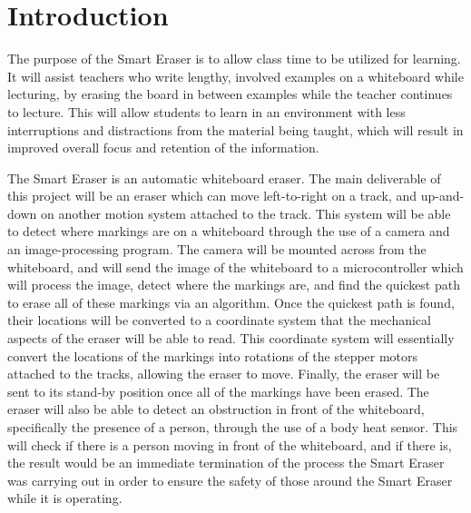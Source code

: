  \section{Introduction}
 The purpose of the Smart Eraser is to allow class time to be utilized for learning. It will assist teachers who write lengthy, involved examples on a whiteboard while lecturing, by erasing the board in between examples while the teacher continues to lecture. This will allow students to learn in an environment with less interruptions and distractions from the material being taught, which will result in improved overall focus and retention of the information.  
 \par
\setlength{\parindent}{2.5ex}The Smart Eraser is an automatic whiteboard eraser. The main deliverable of  this project will be an eraser which can move left-to-right on a track, and up-and-down on another motion system attached to the track. This system will be able to detect where markings are on a whiteboard through the use of a camera and an image-processing program. The camera will be mounted across from the whiteboard, and will send the image of the whiteboard to a microcontroller which will process the image, detect where the markings are, and find the quickest path to erase all of these markings via an algorithm. Once the quickest path is found, their locations will be converted to a coordinate system that the mechanical aspects of the eraser will be able to read. This coordinate system will essentially convert the locations of the markings into rotations of the stepper motors attached to the tracks, allowing the eraser to move. Finally, the eraser will be sent to its stand-by position once all of the markings have been erased. The eraser will also be able to detect an obstruction in front of the whiteboard, specifically the presence of a person, through the use of a body heat sensor. This will check if there is a person moving in front of the whiteboard, and if there is, the result would be an immediate termination of the process the Smart Eraser was carrying out in order to ensure the safety of those around the Smart Eraser while it is operating.

